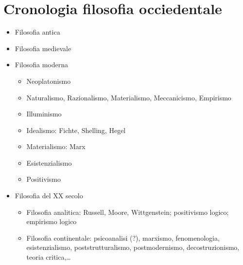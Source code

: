 \documentclass[letterpaper,10pt,italian]{jupyterBook}
\begin{document}
\chapter{Cronologia filosofia occiedentale}
\label{\detokenize{ch/history:cronologia-filosofia-occiedentale}}\label{\detokenize{ch/history:philosophy-chronology}}\label{\detokenize{ch/history::doc}}\begin{itemize}
\item {} 
\sphinxAtStartPar
Filosofia antica

\item {} 
\sphinxAtStartPar
Filosofia medievale

\item {} 
\sphinxAtStartPar
Filosofia moderna
\begin{itemize}
\item {} 
\sphinxAtStartPar
Neoplatonismo

\item {} 
\sphinxAtStartPar
Naturalismo, Razionalismo, Materialismo, Meccanicismo, Empirismo

\item {} 
\sphinxAtStartPar
Illuminismo

\item {} 
\sphinxAtStartPar
Idealismo: Fichte, Shelling, Hegel

\item {} 
\sphinxAtStartPar
Materialismo: Marx

\item {} 
\sphinxAtStartPar
Esistenzialismo

\item {} 
\sphinxAtStartPar
Positivismo

\end{itemize}

\item {} 
\sphinxAtStartPar
Filosofia del XX secolo
\begin{itemize}
\item {} 
\sphinxAtStartPar
Filosofia analitica: Russell, Moore, Wittgenstein; positivismo logico; empirismo logico

\item {} 
\sphinxAtStartPar
Filosofia continentale: psicoanalisi (?), marxismo, fenomenologia, esistenzialismo, post\sphinxhyphen{}strutturalismo, post\sphinxhyphen{}modernismo, decostruzionismo, teoria critica,…

\end{itemize}

\end{itemize}
\end{document}
